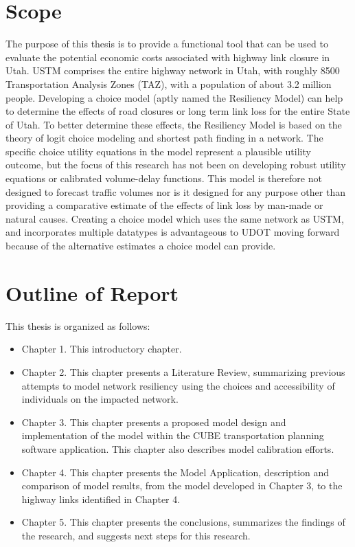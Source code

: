 \section{Scope}
The purpose of this thesis is to provide a functional tool that can be used to evaluate
the potential economic costs associated with highway link closure in Utah. USTM comprises
the entire highway network in Utah, with roughly 8500 Transportation Analysis Zones (TAZ),
with a population of about 3.2 million people.
Developing a choice model (aptly named the Resiliency Model) can help to determine
the effects of road closures or long term link loss for the entire State of Utah.
To better determine these effects, the Resiliency Model is based on the theory of logit choice modeling and
shortest path finding in a network. The specific choice utility equations in the model represent
a plausible utility outcome, but the focus of this research has not been on developing robust
utility equations or calibrated volume-delay functions. This model is therefore not designed to
forecast traffic volumes nor is it designed for any purpose other than providing a comparative estimate
of the effects of link loss by man-made or natural causes. Creating a choice model
which uses the same network as USTM, and incorporates multiple datatypes is
advantageous to UDOT moving forward because of the alternative estimates a choice
model can provide.

\section{Outline of Report}

\noindent This thesis is organized as follows:

\begin{itemize}
	\item Chapter 1.	This introductory chapter.
	\item Chapter 2.	This chapter presents a Literature Review, summarizing previous attempts to model network resiliency using the choices and accessibility of individuals on the impacted network.
	\item Chapter 3.	This chapter presents a proposed model design and implementation of the model within the CUBE transportation planning software application. This chapter also describes model calibration efforts.
  \item Chapter 4.	This chapter presents the Model Application, description and comparison of model results, from the model developed in Chapter 3, to the highway links identified in Chapter 4.
	\item Chapter 5.	This chapter presents the conclusions, summarizes the findings of the research, and suggests next steps for this research.
\end{itemize}
